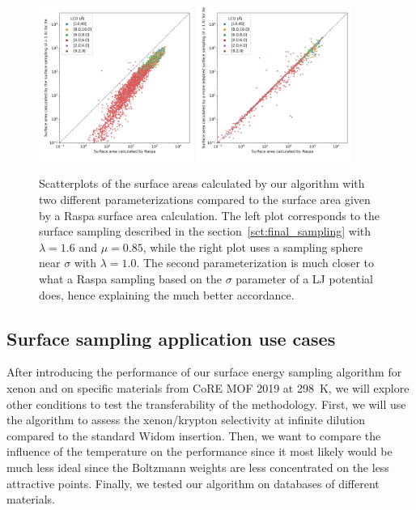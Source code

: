 \documentclass[main]{subfiles}
\begin{document}
\begin{figure}[ht]
  \centering
  \includegraphics[width=0.45\textwidth]{figures/3-fastsim/SA_raspa_Xe_m3_cm3_vs_SA_lambda_1.6_overview.jpg}
  \includegraphics[width=0.45\textwidth]{figures/3-fastsim/SA_raspa_Xe_m3_cm3_vs_SA_lambda_1.0_overview.jpg}
  \caption{Scatterplots of the surface areas calculated by our algorithm with two different parameterizations compared to the surface area given by a Raspa surface area calculation. The left plot corresponds to the surface sampling described in the section~\ref{sct:final_sampling} with $\lambda=1.6$ and $\mu=0.85$, while the right plot uses a sampling sphere near $\sigma$ with $\lambda=1.0$. The second parameterization is much closer to what a Raspa sampling based on the $\sigma$ parameter of a LJ potential does, hence explaining the much better accordance. }\label{fgr:surface_area}
\end{figure}

\subsection{Surface sampling application use cases}

After introducing the performance of our surface energy sampling algorithm for xenon and on specific materials from CoRE MOF 2019 at \SI{298}{\kelvin}, we will explore other conditions to test the transferability of the methodology. First, we will use the algorithm to assess the xenon/krypton selectivity at infinite dilution  compared to the standard Widom insertion. Then, we want to compare the influence of the temperature on the performance since it most likely would be much less ideal since the Boltzmann weights are less concentrated on the less attractive points. Finally, we tested our algorithm on databases of different materials. 
\end{document}
